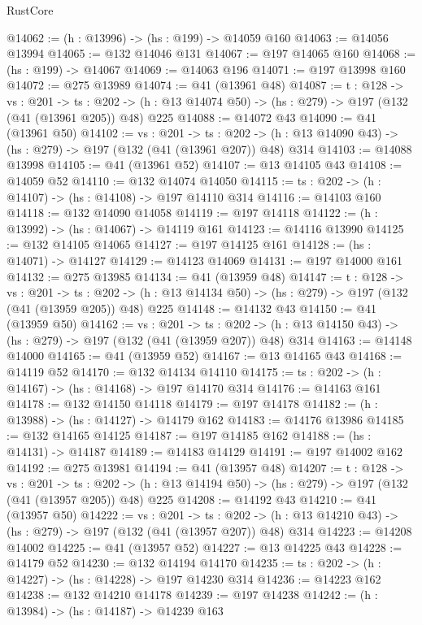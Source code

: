 \begin{lexlean}{RustCore}
\begin{coremodule}
@14062 := (h : @13996) -> (hs : @199) -> @14059 @160
@14063 := @14056 @13994
@14065 := @132 @14046 @131
@14067 := @197 @14065 @160
@14068 := (hs : @199) -> @14067
@14069 := @14063 @196
@14071 := @197 @13998 @160
@14072 := @275 @13989
@14074 := @41 (@13961 @48)
@14087 := {t : @128} ->
  {vs : @201} ->
  {ts : @202} -> (h : @13 @14074 @50) -> (hs : @279) -> @197 (@132 (@41 (@13961 @205)) @48) @225
@14088 := @14072 @43
@14090 := @41 (@13961 @50)
@14102 := {vs : @201} ->
  {ts : @202} -> (h : @13 @14090 @43) -> (hs : @279) -> @197 (@132 (@41 (@13961 @207)) @48) @314
@14103 := @14088 @13998
@14105 := @41 (@13961 @52)
@14107 := @13 @14105 @43
@14108 := @14059 @52
@14110 := @132 @14074 @14050
@14115 := {ts : @202} -> (h : @14107) -> (hs : @14108) -> @197 @14110 @314
@14116 := @14103 @160
@14118 := @132 @14090 @14058
@14119 := @197 @14118
@14122 := (h : @13992) -> (hs : @14067) -> @14119 @161
@14123 := @14116 @13990
@14125 := @132 @14105 @14065
@14127 := @197 @14125 @161
@14128 := (hs : @14071) -> @14127
@14129 := @14123 @14069
@14131 := @197 @14000 @161
@14132 := @275 @13985
@14134 := @41 (@13959 @48)
@14147 := {t : @128} ->
  {vs : @201} ->
  {ts : @202} -> (h : @13 @14134 @50) -> (hs : @279) -> @197 (@132 (@41 (@13959 @205)) @48) @225
@14148 := @14132 @43
@14150 := @41 (@13959 @50)
@14162 := {vs : @201} ->
  {ts : @202} -> (h : @13 @14150 @43) -> (hs : @279) -> @197 (@132 (@41 (@13959 @207)) @48) @314
@14163 := @14148 @14000
@14165 := @41 (@13959 @52)
@14167 := @13 @14165 @43
@14168 := @14119 @52
@14170 := @132 @14134 @14110
@14175 := {ts : @202} -> (h : @14167) -> (hs : @14168) -> @197 @14170 @314
@14176 := @14163 @161
@14178 := @132 @14150 @14118
@14179 := @197 @14178
@14182 := (h : @13988) -> (hs : @14127) -> @14179 @162
@14183 := @14176 @13986
@14185 := @132 @14165 @14125
@14187 := @197 @14185 @162
@14188 := (hs : @14131) -> @14187
@14189 := @14183 @14129
@14191 := @197 @14002 @162
@14192 := @275 @13981
@14194 := @41 (@13957 @48)
@14207 := {t : @128} ->
  {vs : @201} ->
  {ts : @202} -> (h : @13 @14194 @50) -> (hs : @279) -> @197 (@132 (@41 (@13957 @205)) @48) @225
@14208 := @14192 @43
@14210 := @41 (@13957 @50)
@14222 := {vs : @201} ->
  {ts : @202} -> (h : @13 @14210 @43) -> (hs : @279) -> @197 (@132 (@41 (@13957 @207)) @48) @314
@14223 := @14208 @14002
@14225 := @41 (@13957 @52)
@14227 := @13 @14225 @43
@14228 := @14179 @52
@14230 := @132 @14194 @14170
@14235 := {ts : @202} -> (h : @14227) -> (hs : @14228) -> @197 @14230 @314
@14236 := @14223 @162
@14238 := @132 @14210 @14178
@14239 := @197 @14238
@14242 := (h : @13984) -> (hs : @14187) -> @14239 @163

\end{coremodule}
\end{lexlean}
